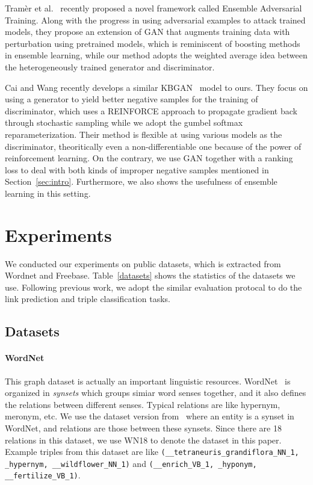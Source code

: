 \documentclass[twocolumn,a4paper,10pt,review,5p]{elsarticle}
\begin{document}
Tram\`er et al.~\cite{EnsembleAdvTraining} recently proposed a novel framework called Ensemble Adversarial Training. Along with the progress in using adversarial examples to attack trained models, they propose an extension of GAN that augments training data with perturbation using pretrained models, which is reminiscent of boosting methods in ensemble learning, while our method adopts the weighted average idea between the heterogeneously trained generator and discriminator.

Cai and Wang recently develops a similar KBGAN~\cite{Cai2017KBGAN} model to ours. They focus on using a generator to yield better negative samples for the training of discriminator, which uses a REINFORCE approach to propagate gradient back through stochastic sampling while we adopt the gumbel softmax reparameterization. Their method is flexible at using various models as the discriminator, theoritically even a non-differentiable one because of the power of reinforcement learning. On the contrary, we use GAN together with a ranking loss to deal with both kinds of improper negative samples mentioned in Section~\ref{sec:intro}. Furthermore, we also shows the usefulness of ensemble learning in this setting.



\section{Experiments}

We conducted our experiments on public datasets, which is extracted from Wordnet and Freebase. Table~\ref{datasets} shows the statistics of the datasets we use. Following previous work, we adopt the similar evaluation protocal to do the link prediction and triple classification tasks.

\subsection{Datasets}

\paragraph{WordNet} This graph dataset is actually an important linguistic resources. WordNet~\cite{miller1995wordnet} is organized in \emph{synsets} which groups simiar word senses together, and it also defines the relations between different senses. Typical relations are like hypernym, meronym, etc. We use the dataset version from~\cite{bordes2014SME} where an entity is a synset in WordNet, and relations are those between these synsets. Since there are 18 relations in this dataset, we use WN18 to denote the dataset in this paper. Example triples from this dataset are like \texttt{({\_}{\_}tetraneuris{\_}grandiflora{\_}NN{\_}1, {\_}hypernym, {\_}{\_}wildflower{\_}NN{\_}1)} and \texttt{({\_}{\_}enrich{\_}VB{\_}1, {\_}hyponym, {\_}{\_}fertilize{\_}VB{\_}1)}.
\end{document}
